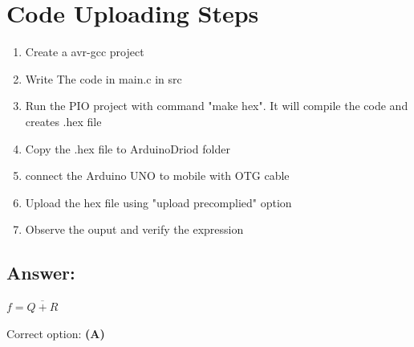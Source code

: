 \documentclass[a4paper,12pt]{article}
\begin{document}
\section*{Code Uploading Steps}
\begin{enumerate}
	\item Create a avr-gcc  project
	\item Write The code in main.c in src
	\item Run the PIO project with command "make hex". It will compile the code and creates .hex file
	\item Copy the .hex file to ArduinoDriod folder
	\item connect the Arduino UNO to mobile with OTG cable
	\item Upload the hex file using "upload precomplied" option
	\item Observe the ouput and verify the expression
\end{enumerate}


\subsection*{Answer:}

$
\boxed{f = \overline{Q + R}}
$

Correct option: \textbf{(A)}
\end{document}
